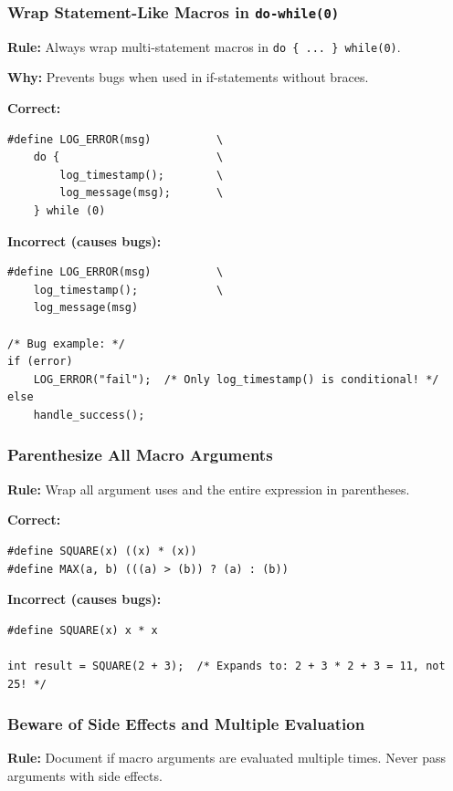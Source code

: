 \subsubsection{Wrap Statement-Like Macros in \texttt{do-while(0)}}

\textbf{Rule:} Always wrap multi-statement macros in \texttt{do \{ ... \} while(0)}.

\textbf{Why:} Prevents bugs when used in if-statements without braces.

\textbf{Correct:}
\begin{verbatim}
#define LOG_ERROR(msg)          \
    do {                        \
        log_timestamp();        \
        log_message(msg);       \
    } while (0)
\end{verbatim}

\textbf{Incorrect (causes bugs):}
\begin{verbatim}
#define LOG_ERROR(msg)          \
    log_timestamp();            \
    log_message(msg)

/* Bug example: */
if (error)
    LOG_ERROR("fail");  /* Only log_timestamp() is conditional! */
else
    handle_success();
\end{verbatim}

\subsubsection{Parenthesize All Macro Arguments}

\textbf{Rule:} Wrap all argument uses and the entire expression in parentheses.

\textbf{Correct:}
\begin{verbatim}
#define SQUARE(x) ((x) * (x))
#define MAX(a, b) (((a) > (b)) ? (a) : (b))
\end{verbatim}

\textbf{Incorrect (causes bugs):}
\begin{verbatim}
#define SQUARE(x) x * x

int result = SQUARE(2 + 3);  /* Expands to: 2 + 3 * 2 + 3 = 11, not 25! */
\end{verbatim}

\subsubsection{Beware of Side Effects and Multiple Evaluation}

\textbf{Rule:} Document if macro arguments are evaluated multiple times. Never pass arguments with side effects.

